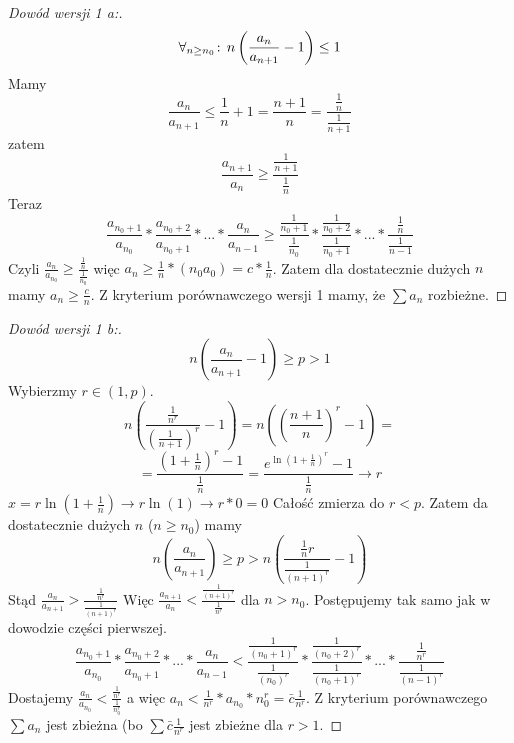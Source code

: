 \documentclass[9pt]{article}
\begin{document}
\begin{proof}[Dowód wersji 1 a:]
    \[
        \forall_{n \ge n_0} \! : \, n\left(\frac{a_n}{a_{n+1}} - 1\right) \le 1
    \]
    Mamy
    \[
        \frac{a_n}{a_{n+1}} \le \frac{1}{n} + 1 = \frac{n+1}{n} = \frac{\frac{1}{n}}{ \frac{1}{n+1}}
    \]
    zatem
    \[
        \frac{a_{n+1}}{a_n} \ge \frac{\frac{1}{n+1}}{\frac{1}{n}}
    \]
    Teraz
    \[
        \frac{a_{n_0+1}}{ a_{n_0}} *
        \frac{a_{n_0+2}}{ a_{n_0 + 1}} * ... *
        \frac{a_{n}}{ a_{n - 1}}
        \ge
        \frac{\frac{1}{n_0+1}}{ \frac{1}{n_0}} *
        \frac{\frac{1}{n_0+2}}{ \frac{1}{n_0+1}} * ... *
        \frac{\frac{1}{n}}{ \frac{1}{n-1}}
    \]
    Czyli $\frac{a_n}{a_{n_0}} \ge \frac{\frac{1}{n}}{ \frac{1}{n_0}}$ więc
    $a_n \ge \frac{1}{n} * (n_0 a_0) = c * \frac{1}{n}$.
    Zatem dla dostatecznie dużych $n$ mamy $a_n \ge \frac{c}{n}$. Z kryterium porównawczego wersji 1
    mamy, że $\sum a_n$ rozbieżne.
\end{proof}

\begin{proof}[Dowód wersji 1 b:]
    \[
        n \left(\frac{a_n}{a_{n+1}} - 1\right) \ge p > 1
    \]
    Wybierzmy $r \in (1, p)$.
    \[
        n \left(\frac{\frac{1}{n^r}}{ \left(\frac{1}{n+1}\right)^r} - 1\right)
        =
        n \left( \left(\frac{n+1}{n}\right)^r - 1\right)
        =
    \]
    \[
        =
        \frac{\left(1 + \frac{1}{n}\right)^r - 1}{ \frac{1}{n}}
        =
        \frac{e^{\ln\left(1 + \frac{1}{n}\right)^r} - 1}{ \frac{1}{n}}
        \to r
    \]
    $x = r \ln (1+ \frac{1}{n}) \to r \ln(1) \to r*0 = 0$
    Całość zmierza do $r < p$. Zatem da dostatecznie dużych $n$ ($n \ge n_0$) mamy
    \[
        n \left(\frac{a_n}{a_{n+1}}\right)
        \ge p
        >
        n (\frac{\frac{1}{n}r}{ \frac{1}{(n+1)^r}} - 1)
    \]
    Stąd
    $\frac{a_n}{a_{n+1}} > \frac{\frac{1}{n^r}}{ \frac{1}{(n+1)^r}}$
    Więc
    $\frac{a_{n+1}}{a_n} < \frac{\frac{1}{(n+1)^r}}{ \frac{1}{n^r}}$ dla $n > n_0$.
    Postępujemy tak samo jak w dowodzie części pierwszej.
    \[
        \frac{a_{n_0+1}}{ a_{n_0}} *
        \frac{a_{n_0+2}}{ a_{n_0 + 1}} * ... *
        \frac{a_{n}}{ a_{n - 1}}
        <
        \frac{\frac{1}{(n_0+1)^r}}{ \frac{1}{(n_0)^r}} *
        \frac{\frac{1}{(n_0+2)^r}}{ \frac{1}{(n_0+1)^r}} * ... *
        \frac{\frac{1}{n^r}}{ \frac{1}{(n-1)^r}}
    \]
    Dostajemy $\frac{a_n}{a_{n_0}} < \frac{\frac{1}{n^r}}{ \frac{1}{n_0^r}}$ a więc
    $a_n < \frac{1}{n^r} * a_{n_0} * n_0^r = \bar{c} \frac{1}{n^r}$. Z kryterium porównawczego
    $\sum a_n$ jest zbieżna (bo $\sum \bar{c} \frac{1}{n^r}$ jest zbieżne dla $r > 1$.
\end{proof}
\end{document}
